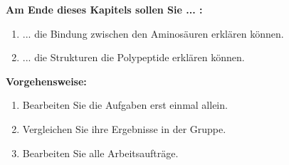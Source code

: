 \documentclass{scrartcl}  %
\begin{document}
		\begin{minipage}{0.7\textwidth}
			\noindent \textbf{Am Ende dieses Kapitels sollen Sie ... :}
			\begin{enumerate}
				\item ... die Bindung zwischen den Aminosäuren erklären können.
				\item ... die Strukturen die Polypeptide erklären können.
			\end{enumerate}
			\textbf{Vorgehensweise:}
			\begin{enumerate}
				\item Bearbeiten Sie die Aufgaben erst einmal allein.
				\item Vergleichen Sie ihre Ergebnisse in der Gruppe.
				\item Bearbeiten Sie alle Arbeitsaufträge.
			\end{enumerate}
			
		\end{minipage}
		\hspace{0.1\textwidth}
\end{document}
